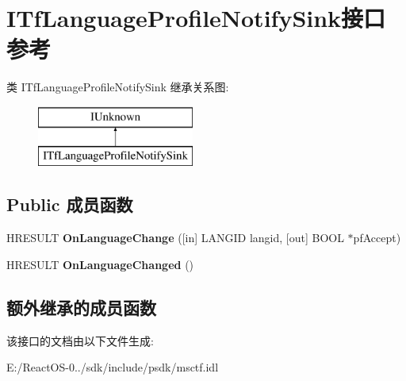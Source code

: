 \hypertarget{interface_i_tf_language_profile_notify_sink}{}\section{I\+Tf\+Language\+Profile\+Notify\+Sink接口 参考}
\label{interface_i_tf_language_profile_notify_sink}
类 I\+Tf\+Language\+Profile\+Notify\+Sink 继承关系图\+:\begin{figure}[H]
\begin{center}
\leavevmode
\includegraphics[height=2.000000cm]{interface_i_tf_language_profile_notify_sink}
\end{center}
\end{figure}
\subsection*{Public 成员函数}
\begin{DoxyCompactItemize}
\item 
\mbox{\label{interface_i_tf_language_profile_notify_sink_aeeb751f05ea98c164ed16a117ccd8d1e}} 
H\+R\+E\+S\+U\+LT {\bfseries On\+Language\+Change} (\mbox{[}in\mbox{]} L\+A\+N\+G\+ID langid, \mbox{[}out\mbox{]} B\+O\+OL $\ast$pf\+Accept)
\item 
\mbox{\label{interface_i_tf_language_profile_notify_sink_a57ccd881e644410d299252ba618aecc0}} 
H\+R\+E\+S\+U\+LT {\bfseries On\+Language\+Changed} ()
\end{DoxyCompactItemize}
\subsection*{额外继承的成员函数}


该接口的文档由以下文件生成\+:\begin{DoxyCompactItemize}
\item 
E\+:/\+React\+O\+S-\/0../sdk/include/psdk/msctf.\+idl\end{DoxyCompactItemize}
